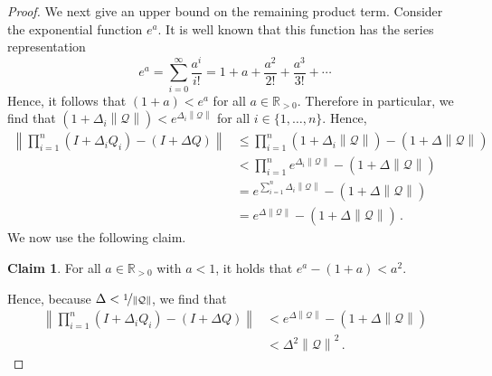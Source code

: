 \documentclass[10pt]{paper}
\theoremstyle{definition}
\newtheorem{claim}{Claim}[theorem]
\newcommand{\reals}{\mathbb{R}}
\newcommand{\realspos}{\reals_{>0}}
\newcommand{\rateset}{\mathcal{Q}}
\newcommand{\norm}[1]{\left\lVert #1 \right\rVert}
\begin{document}
\begin{proof}
We next give an upper bound on the remaining product term. Consider the exponential function $e^a$. It is well known that this function has the series representation
\begin{equation*}
e^a = \sum_{i=0}^\infty\frac{a^i}{i!} = 1 + a + \frac{a^2}{2!} + \frac{a^3}{3!} + \cdots
\end{equation*}
Hence, it follows that $(1+a)<e^a$ for all $a\in\realspos$. Therefore in particular, we find that $(1+\Delta_i\norm{\rateset})<e^{\Delta_i\norm{\rateset}}$ for all $i\in\{1,\ldots,n\}$. Hence,
\begin{align*}
\norm{\prod_{i=1}^n(I+\Delta_iQ_i) - (I+\Delta Q)} &\leq \prod_{i=1}^n(1+\Delta_i\norm{\rateset}) - (1 + \Delta\norm{\rateset}) \\
 &< \prod_{i=1}^n e^{\Delta_i\norm{\rateset}} - (1 + \Delta\norm{\rateset}) \\
 &= e^{\sum_{i=1}^n\Delta_i\norm{\rateset}} - (1 + \Delta\norm{\rateset}) \\
 &= e^{\Delta\norm{\rateset}} - (1 + \Delta\norm{\rateset})\,.
\end{align*}
We now use the following claim.
\begin{claim}\label{claim:bound_on_exp}
For all $a\in\realspos$ with $a<1$, it holds that $e^a - (1 + a) < a^2$.
\end{claim}
Hence, because $\Delta<\nicefrac{1}{\norm{\rateset}}$, we find that
\begin{align*}
\norm{\prod_{i=1}^n(I+\Delta_iQ_i) - (I+\Delta Q)} &< e^{\Delta\norm{\rateset}} - (1 + \Delta\norm{\rateset}) \\
 &< \Delta^2\norm{\rateset}^2\,.
\end{align*}
\end{proof}
\end{document}
